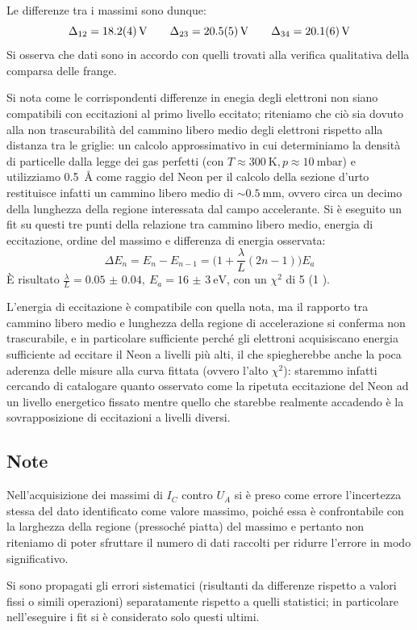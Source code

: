 	Le differenze tra i massimi sono dunque:
	$$\Delta_{12}=\SI{18.2\pm 0.4}{\volt} \qquad \Delta_{23}=\SI{20.5 \pm 0.5}{\volt} \qquad \Delta_{34}=\SI{20.1 \pm 0.6}{\volt}$$
	Si osserva che dati sono in accordo con quelli trovati alla
	verifica qualitativa della comparsa delle frange.

	Si nota come le corrispondenti differenze in enegia degli elettroni non siano
	compatibili con eccitazioni al primo livello eccitato;
	riteniamo che ciò sia dovuto alla non trascurabilità del cammino libero medio
	degli elettroni rispetto alla distanza tra le griglie: un calcolo approssimativo
	in cui determiniamo la densità di particelle dalla legge dei gas perfetti
	(con $T \approx \SI{300}{\K}, p \approx \SI{10}{\milli\bar}$) e utilizziamo
	\SI{0.5}{\angstrom} come raggio del Neon per il calcolo della sezione d'urto
	restituisce infatti un cammino libero medio di $\sim \SI{0.5}{\mm}$,
	ovvero circa un decimo della lunghezza della regione interessata dal campo accelerante.
	Si è eseguito un fit su questi tre punti della relazione tra cammino libero medio,
	energia di eccitazione, ordine del massimo e differenza di energia osservata:
	$$ \Delta E_n = E_n - E_{n-1} = \big(1 + \frac{\lambda}{L}(2n - 1)\big) E_a $$
	È risultato $\frac{\lambda}{L} = \SI{0.05(4)}, \ E_a = \SI{16(3)}{\eV}$, con un $\chi^2$ di 5 (1 \dof).

	L'energia di eccitazione è compatibile con quella nota, ma
	il rapporto tra cammino libero medio e lunghezza della regione di accelerazione
	si conferma non trascurabile, e in particolare sufficiente perché gli elettroni acquisiscano
	energia sufficiente ad eccitare il Neon a livelli più alti, il che
	spiegherebbe anche la poca aderenza delle misure alla curva fittata (ovvero
	l'alto $\chi^2$): staremmo infatti cercando di catalogare quanto osservato
	come la ripetuta eccitazione del Neon ad un livello energetico fissato
	mentre quello che starebbe realmente accadendo è la sovrapposizione di
	eccitazioni a livelli diversi.

\subsection{Note}
Nell'acquisizione dei massimi di $I_C$ contro $U_A$ si è preso come errore
l'incertezza stessa del dato identificato come valore massimo, poiché essa è confrontabile con
la larghezza della regione (pressoché piatta) del massimo e pertanto non riteniamo
di poter sfruttare il numero di dati raccolti per ridurre l'errore in modo significativo.

Si sono propagati gli errori sistematici (risultanti da differenze rispetto a valori fissi
o simili operazioni) separatamente rispetto a quelli statistici; in particolare
nell'eseguire i fit si è considerato solo questi ultimi.
